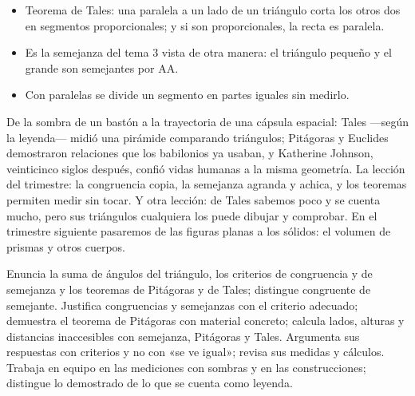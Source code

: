 \documentclass[11pt]{article}
\begin{document}
\begin{resumen}
\begin{itemize}
  \item Teorema de Tales: una paralela a un lado de un triángulo corta los
        otros dos en segmentos proporcionales; y si son proporcionales, la
        recta es paralela.
  \item Es la semejanza del tema 3 vista de otra manera: el triángulo
        pequeño y el grande son semejantes por AA.
  \item Con paralelas se divide un segmento en partes iguales sin medirlo.
\end{itemize}
\end{resumen}


De la sombra de un bastón a la trayectoria de una cápsula espacial: Tales
—según la leyenda— midió una pirámide comparando triángulos; Pitágoras y
Euclides demostraron relaciones que los babilonios ya usaban, y Katherine
Johnson, veinticinco siglos después, confió vidas humanas a la misma
geometría. La lección del trimestre: la congruencia copia, la semejanza
agranda y achica, y los teoremas permiten medir sin tocar. Y otra lección:
de Tales sabemos poco y se cuenta mucho, pero sus triángulos cualquiera los
puede dibujar y comprobar. En el trimestre siguiente pasaremos de las
figuras planas a los sólidos: el volumen de prismas y otros cuerpos.

\matrizevaluacion
  {Enuncia la suma de ángulos del triángulo, los criterios de congruencia y
   de semejanza y los teoremas de Pitágoras y de Tales; distingue congruente
   de semejante.}
  {Justifica congruencias y semejanzas con el criterio adecuado; demuestra el
   teorema de Pitágoras con material concreto; calcula lados, alturas y
   distancias inaccesibles con semejanza, Pitágoras y Tales.}
  {Argumenta sus respuestas con criterios y no con «se ve igual»; revisa sus
   medidas y cálculos.}
  {Trabaja en equipo en las mediciones con sombras y en las construcciones;
   distingue lo demostrado de lo que se cuenta como leyenda.}

\autoevaluacion
\end{document}
